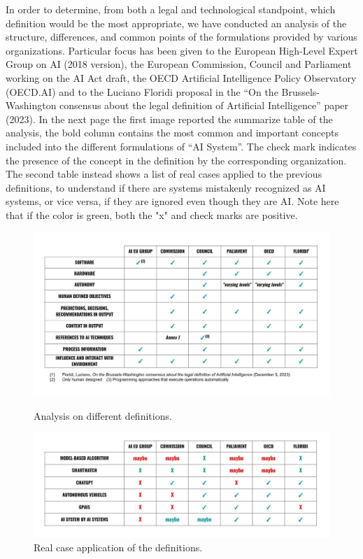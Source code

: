 \documentclass[12pt]{article}
\begin{document}
In order to determine, from both a legal and technological standpoint, which definition would be the most appropriate, we have conducted an analysis of the structure, differences, and common points of the formulations provided by various organizations. Particular focus has been given to the European High-Level Expert Group on AI (2018 version), the European Commission, Council and Parliament working on the AI Act draft, the OECD Artificial Intelligence Policy Observatory (OECD.AI) and to the Luciano Floridi proposal in the “On the Brussels-Washington consensus about the legal definition of Artificial Intelligence” paper (2023).
In the next page the first image reported the summarize table of the analysis, the bold column contains the most common and important concepts included into the different formulations of “AI System”. The check mark indicates the presence of the concept in the definition by the corresponding organization.
The second table instead shows a list of real cases applied to the previous definitions, to understand if there are systems mistakenly recognized as AI systems, or vice versa, if they are ignored even though they are AI. Note here that if the color is green, both the "x" and check marks are positive. 


\begin{figure}[ht]
  \centering
  \includegraphics[width=135mm]{img/aa-1.jpg}
  \caption{Analysis on different definitions.}
  \vspace{1em} %
  \includegraphics[width=135mm]{img/aa-3.jpg}
  \caption{Real case application of the definitions.}
\end{figure}
\end{document}
